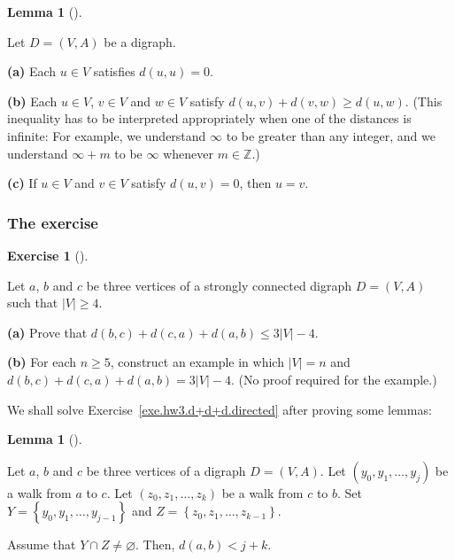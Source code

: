 \documentclass[numbers=enddot,12pt,final,onecolumn,notitlepage]{scrartcl}%
\newcounter{exer}
\theoremstyle{definition}
\newtheorem{lem}[theo]{Lemma}
\newenvironment{lemma}[1][]
{\begin{lem}[#1]\begin{leftbar}}
{\end{leftbar}\end{lem}}
\newtheorem{exmp}[exer]{Exercise}
\newenvironment{exercise}[1][]
{\begin{exmp}[#1]\begin{leftbar}}
{\end{leftbar}\end{exmp}}
\newcommand{\ZZ}{\mathbb{Z}}
\newcommand{\set}[1]{\left\{ #1 \right\}}
\newcommand{\abs}[1]{\left| #1 \right|}
\newcommand{\tup}[1]{\left( #1 \right)}
\begin{document}
\begin{lemma} \label{lem.hw3.distances-metric}
Let $D = \tup{V, A}$ be a digraph.

\textbf{(a)} Each $u \in V$ satisfies $d \tup{u, u} = 0$.

\textbf{(b)} Each $u \in V$, $v \in V$ and $w \in V$ satisfy
$d \tup{u, v} + d \tup{v, w} \geq d \tup{u, w}$.
(This inequality has to be interpreted appropriately when one of the
distances is infinite: For example, we understand $\infty$ to be
greater than any integer, and we understand $\infty + m$ to be
$\infty$ whenever $m \in \ZZ$.)

\textbf{(c)} If $u \in V$ and $v \in V$ satisfy $d \tup{u, v} = 0$,
then $u = v$.
\end{lemma}

\subsubsection{The exercise}

\begin{exercise} \label{exe.hw3.d+d+d.directed}
Let $a$, $b$ and $c$ be three vertices of a strongly connected
digraph $D = \tup{V, A}$ such that $\abs{V} \geq 4$.

\textbf{(a)} Prove that
$d \tup{b, c} + d \tup{c, a} + d \tup{a, b} \leq 3 \abs{V} - 4$.

\textbf{(b)} For each $n \geq 5$, construct an example in which
$\abs{V} = n$ and
$d \tup{b, c} + d \tup{c, a} + d \tup{a, b} = 3 \abs{V} - 4$.
(No proof required for the example.)
\end{exercise}

We shall solve Exercise~\ref{exe.hw3.d+d+d.directed} after proving
some lemmas:

\begin{lemma} \label{lem.hw3.d+d+d.subwalks}
Let $a$, $b$ and $c$ be three vertices of a digraph $D = \tup{V, A}$.
Let $\tup{y_0, y_1, \ldots, y_j}$ be a walk from $a$ to $c$.
Let $\tup{z_0, z_1, \ldots, z_k}$ be a walk from $c$ to $b$.
Set $Y = \set{y_0, y_1, \ldots, y_{j-1}}$
and $Z = \set{z_0, z_1, \ldots, z_{k-1}}$.

Assume that $Y \cap Z \neq \varnothing$.
Then, $d \tup{a, b} < j + k$.
\end{lemma}
\end{document}
